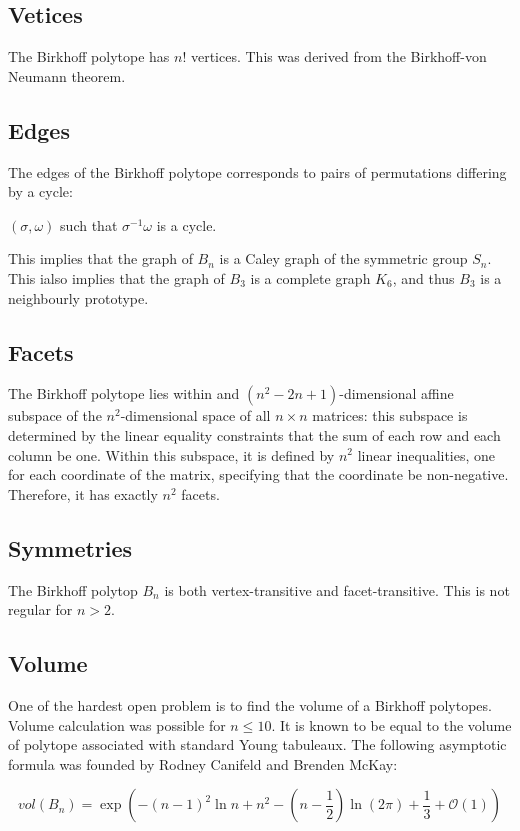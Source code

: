 \subsection{Vetices}
The Birkhoff polytope has $n!$ vertices. This was derived from the Birkhoff-von Neumann theorem.
\subsection{Edges}
The edges of the Birkhoff polytope corresponds to pairs of permutations differing by a cycle:

$(\sigma,\omega)$ such that $\sigma^{-1}\omega$ is a cycle.

This implies that the graph of $B_n$ is a Caley graph of the symmetric group $S_n$. This ialso implies that the graph of $B_3$ is a complete graph $K_6$, and thus $B_3$ is a neighbourly prototype.

\subsection{Facets}
The Birkhoff polytope lies within and $(n^2-2n+1)$-dimensional affine subspace of the $n^2$-dimensional space of all $n\times n$ matrices: this subspace is determined by the linear equality constraints that the sum of each row and each column be one. Within this subspace, it is defined by $n^2$ linear inequalities, one for each coordinate of the matrix, specifying that the coordinate be non-negative. Therefore, it has exactly $n^2$ facets.

\subsection{Symmetries}
The Birkhoff polytop $B_n$ is both vertex-transitive and facet-transitive. This is not regular for $n>2$.

\subsection{Volume}
One of the hardest open problem is to find the volume of a Birkhoff polytopes. Volume calculation was possible for $n\leqslant 10$. It is known to be equal to the volume of polytope associated with standard Young tabuleaux. The following asymptotic formula was founded by Rodney Canifeld and Brenden McKay:

\begin{equation}
vol(B_n)=\exp(-(n-1)^2 \ln n + n^2 - (n-\frac{1}{2} )\ln(2\pi)+\frac{1}{3}+\mathcal{O}(1))
\label{eqn:Birkhoff_volume}
\end{equation}	